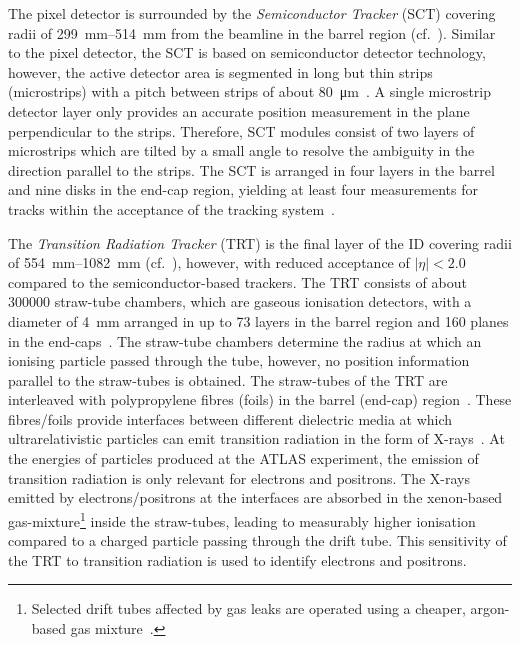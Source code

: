 The pixel detector is surrounded by the \emph{Semiconductor Tracker} (SCT)
covering radii of \SIrange{299}{514}{\milli\metre} from the beamline in the
barrel region (cf.\ ). Similar to the pixel
detector, the SCT is based on semiconductor detector technology, however, the
active detector area is segmented in long but thin strips (microstrips) with a
pitch between strips of about \SI{80}{\micro\metre}~\cite{PERF-2007-01}. A
single microstrip detector layer only provides an accurate position measurement
in the plane perpendicular to the strips. Therefore, SCT modules consist of two
layers of microstrips which are tilted by a small angle to resolve the ambiguity
in the direction parallel to the strips. The SCT is arranged in four layers in
the barrel and nine disks in the end-cap region, yielding at least four
measurements for tracks within the acceptance of the tracking
system~\cite{PERF-2007-01}.

The \emph{Transition Radiation Tracker} (TRT) is the final layer of the ID
covering radii of \SIrange{554}{1082}{\milli\metre} (cf.\
), however, with reduced acceptance of
$|\eta| < 2.0$ compared to the semiconductor-based trackers. The TRT consists of
about \num{300000} straw-tube chambers, which are gaseous ionisation detectors,
with a diameter of \SI{4}{\milli\metre} arranged in up to 73 layers in the
barrel region and 160 planes in the end-caps~\cite{PERF-2007-01}. The straw-tube
chambers determine the radius at which an ionising particle passed through the
tube, however, no position information parallel to the straw-tubes is obtained.
The straw-tubes of the TRT are interleaved with polypropylene fibres (foils) in
the barrel (end-cap) region~\cite{PERF-2007-01}. These fibres/foils provide
interfaces between different dielectric media at which ultrarelativistic
particles can emit transition radiation in the form of
X-rays~\cite{Grupen:2008zz}. At the energies of particles produced at the ATLAS
experiment, the emission of transition radiation is only relevant for electrons
and positrons. The X-rays emitted by electrons/positrons at the interfaces are
absorbed in the xenon-based gas-mixture\footnote{Selected drift tubes affected
  by gas leaks are operated using a cheaper, argon-based gas
  mixture~\cite{IDET-2015-01}.} inside the straw-tubes, leading to measurably
higher ionisation compared to a charged particle passing through the drift
tube. This sensitivity of the TRT to transition radiation is used to identify
electrons and positrons.

